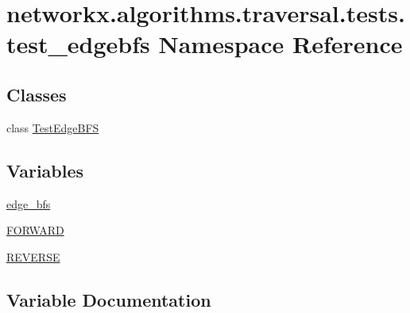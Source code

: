 \hypertarget{namespacenetworkx_1_1algorithms_1_1traversal_1_1tests_1_1test__edgebfs}{}\section{networkx.\+algorithms.\+traversal.\+tests.\+test\+\_\+edgebfs Namespace Reference}
\label{namespacenetworkx_1_1algorithms_1_1traversal_1_1tests_1_1test__edgebfs}
\subsection*{Classes}
\begin{DoxyCompactItemize}
\item 
class \hyperlink{classnetworkx_1_1algorithms_1_1traversal_1_1tests_1_1test__edgebfs_1_1TestEdgeBFS}{Test\+Edge\+B\+FS}
\end{DoxyCompactItemize}
\subsection*{Variables}
\begin{DoxyCompactItemize}
\item 
\hyperlink{namespacenetworkx_1_1algorithms_1_1traversal_1_1tests_1_1test__edgebfs_ac57e79058c58ab2899d2f5f966af1cd6}{edge\+\_\+bfs}
\item 
\hyperlink{namespacenetworkx_1_1algorithms_1_1traversal_1_1tests_1_1test__edgebfs_ac936a7f3bed605316b9a47d08d1bdc20}{F\+O\+R\+W\+A\+RD}
\item 
\hyperlink{namespacenetworkx_1_1algorithms_1_1traversal_1_1tests_1_1test__edgebfs_afbf7760a954329c0e50d33efd517ecec}{R\+E\+V\+E\+R\+SE}
\end{DoxyCompactItemize}


\subsection{Variable Documentation}
\mbox{\label{namespacenetworkx_1_1algorithms_1_1traversal_1_1tests_1_1test__edgebfs_ac57e79058c58ab2899d2f5f966af1cd6}} 
